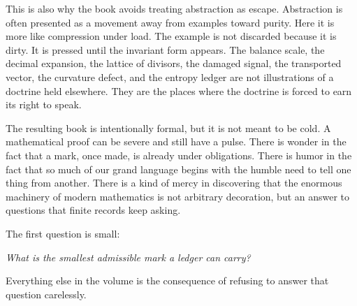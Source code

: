 This is also why the book avoids treating abstraction as escape. Abstraction is
often presented as a movement away from examples toward purity. Here it is more
like compression under load. The example is not discarded because it is dirty.
It is pressed until the invariant form appears. The balance scale, the decimal
expansion, the lattice of divisors, the damaged signal, the transported vector,
the curvature defect, and the entropy ledger are not illustrations of a doctrine
held elsewhere. They are the places where the doctrine is forced to earn its
right to speak.

The resulting book is intentionally formal, but it is not meant to be cold. A
mathematical proof can be severe and still have a pulse. There is wonder in the
fact that a mark, once made, is already under obligations. There is humor in the
fact that so much of our grand language begins with the humble need to tell one
thing from another. There is a kind of mercy in discovering that the enormous
machinery of modern mathematics is not arbitrary decoration, but an answer to
questions that finite records keep asking.

The first question is small:

\begin{center}
\emph{What is the smallest admissible mark a ledger can carry?}
\end{center}

Everything else in the volume is the consequence of refusing to answer that
question carelessly.
